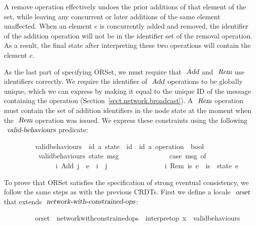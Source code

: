 A remove operation effectively undoes the prior additions of that element of the set, while leaving any concurrent or later additions of the same element unaffected.
When an element $e$ is concurrently added and removed, the identifier of the addition operation will not be in the identifier set of the removal operation.
As a result, the final state after interpreting these two operations will contain the element $e$.

As the last part of specifying ORSet, we must require that $\isa{Add}$ and $\isa{Rem}$ use identifiers correctly.
We require the identifier of $\isa{Add}$ operations to be globally unique, which we can express by making it equal to the unique ID of the message containing the operation (Section~\ref{sect.network.broadcast}).
A $\isa{Rem}$ operation must contain the set of addition identifiers in the node state at the moment when the $\isa{Rem}$ operation was issued.
We express these constraints using the following $\isa{valid-behaviours}$ predicate:
\vspace{0.275em}
\begin{isabellebody}
\ \ \ \ \ \ \ \ \ valid{\isacharunderscore}behaviours\ {\isacharcolon}{\isacharcolon}\ {\isachardoublequoteopen}{\isacharparenleft}{\isacharprime}id{\isacharcomma}\ {\isacharprime}a{\isacharparenright}\ state\ {\isasymRightarrow}\ {\isacharprime}id\ {\isasymtimes}\ {\isacharparenleft}{\isacharprime}id{\isacharcomma}\ {\isacharprime}a{\isacharparenright}\ operation\ {\isasymRightarrow}\ bool{\isachardoublequoteclose}\ \isanewline
\ \ \ \ \ \ \ \ \ \ {\isachardoublequoteopen}valid{\isacharunderscore}behaviours\ state\ msg\ {\isasymequiv}\isanewline
\ \ \ \ \ \ \ \ \ \ \ \ \ case\ msg\ of\isanewline
\ \ \ \ \ \ \ \ \ \ \ \ \ \ \ {\isacharparenleft}i{\isacharcomma}\ Add\ j\ \ e{\isacharparenright}\ {\isasymRightarrow}\ i\ {\isacharequal}\ j\ {\isacharbar}\isanewline
\ \ \ \ \ \ \ \ \ \ \ \ \ \ \ {\isacharparenleft}i{\isacharcomma}\ Rem\ is\ e{\isacharparenright}\ {\isasymRightarrow}\ is\ {\isacharequal}\ state\ e{\isachardoublequoteclose}
\end{isabellebody}
\vspace{0.275em}
To prove that ORSet satisfies the specification of strong eventual consistency, we follow the same steps as with the previous CRDTs.
First we define a locale $\isa{orset}$ that extends $\isa{network-with-constrained-ops}$:
\vspace{0.275em}
\begin{isabellebody}
\ \ \ \ \ \ \ \ \ orset\ {\isacharequal}\ network{\isacharunderscore}with{\isacharunderscore}constrained{\isacharunderscore}ops\ {\isacharunderscore}\ interpret{\isacharunderscore}op\ {\isachardoublequoteopen}{\isacharparenleft}{\isasymlambda}x{\isachardot}\ {\isacharbraceleft}{\isacharbraceright}{\isacharparenright}{\isachardoublequoteclose}\ valid{\isacharunderscore}behaviours
\end{isabellebody}
\vspace{0.275em}

